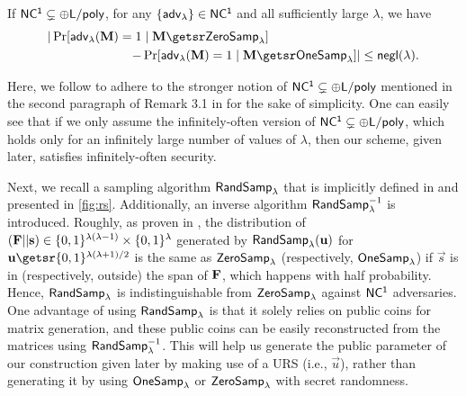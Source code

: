 
\begin{lem}
\label{lem:ind-samp}
If $\mathsf{NC^1} \subsetneq {\sf \oplus L/poly}$, for any $\{{\mathsf{adv}}_\lambda\}\in\mathsf{NC^1}$ and all sufficiently large $\lambda$, we have
\[\begin{split}
|\Pr[\adv(\matr M)=1 &\mid \matr M\getsr\ZeroSamp]\\
-&\Pr[\adv(\matr M)=1\mid\matr M\getsr\OneSamp]|\leq\negl(\lambda).
\end{split}\]
\end{lem}
Here, we follow \cite{JC:EgaWanTan21,C:WanPanChe21,EC:WanPan22} to adhere to the stronger notion of $\mathsf{NC^1} \subsetneq {\sf \oplus L/poly}$ mentioned in the second paragraph of Remark 3.1 in \cite{C:DegVaiVas16} for the sake of simplicity. One can easily see that if we only assume the infinitely-often version of $\mathsf{NC^1} \subsetneq {\sf \oplus L/poly}$, which holds only for an infinitely large number of values of $\lambda$, then our scheme, given later, satisfies infinitely-often security.


Next, we recall a sampling algorithm ${\mathsf{RandSamp}}_\lambda$ that is implicitly defined in \cite{EC:WanPan22} and presented in \cref{fig:rs}. Additionally, an inverse algorithm ${\mathsf{RandSamp}}_\lambda^{-1}$ is introduced. Roughly, as proven in \cite{EC:WanPan22}, the distribution of $(\mathbf{{F}}||\mathbf{s})\in\{0, 1\}^{\lambda(\lambda-1)}\times\{0, 1\}^\lambda$ generated by ${\mathsf{RandSamp}}_\lambda(\mathbf{u})$ for $\vec u\getsr\bin^{\lambda(\lambda+1)/2}$ is the same as ${\mathsf{ZeroSamp}}_\lambda$ (respectively, ${\mathsf{OneSamp}}_\lambda$) if $\vec s$ is in (respectively, outside) the span of $\mathbf{{F}}$, which happens with half probability. Hence, ${\mathsf{RandSamp}}_\lambda$ is indistinguishable from ${\mathsf{ZeroSamp}}_\lambda$ against $\mathsf{NC^1}$ adversaries. One advantage of using ${\mathsf{RandSamp}}_\lambda$ is that it solely relies on public coins for matrix generation, and these public coins can be easily reconstructed from the matrices using ${\mathsf{RandSamp}}_\lambda^{-1}$. This will help us generate the public parameter of our construction given later by making use of a URS (i.e., $\vec u$), rather than generating it by using ${\mathsf{OneSamp}}_\lambda$ or ${\mathsf{ZeroSamp}}_\lambda$ with secret randomness.


